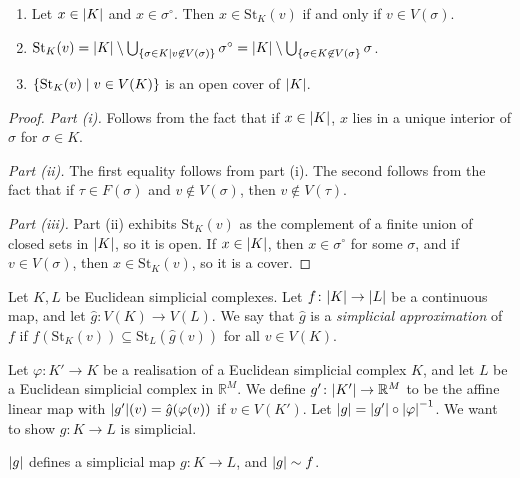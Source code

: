 \begin{lemma}
	\begin{enumerate}
		\item Let \( x \in \abs{K} \) and \( x \in \sigma^\circ \).
			Then \( x \in \mathrm{St}_K(v) \) if and only if \( v \in V(\sigma) \).
		\item \( \mathrm{St}_K(v) = \abs{K} \setminus \bigcup_{\qty{\sigma \in K \mid v \not\in V(\sigma)}} \sigma^\circ = \abs{K} \setminus \bigcup_{\qty{\sigma \in K \not\in V(\sigma}} \sigma \).
		\item \( \qty{\mathrm{St}_K(v) \mid v \in V(K)} \) is an open cover of \( \abs{K} \).
	\end{enumerate}
\end{lemma}
\begin{proof}
	\emph{Part (i).}
	Follows from the fact that if \( x \in \abs{K} \), \( x \) lies in a unique interior of \( \sigma \) for \( \sigma \in K \).

	\emph{Part (ii).}
	The first equality follows from part (i).
	The second follows from the fact that if \( \tau \in F(\sigma) \) and \( v \not\in V(\sigma) \), then \( v \not\in V(\tau) \).

	\emph{Part (iii).}
	Part (ii) exhibits \( \mathrm{St}_K(v) \) as the complement of a finite union of closed sets in \( \abs{K} \), so it is open.
	If \( x \in \abs{K} \), then \( x \in \sigma^\circ \) for some \( \sigma \), and if \( v \in V(\sigma) \), then \( x \in \mathrm{St}_K(v) \), so it is a cover.
\end{proof}
\begin{definition}
	Let \( K, L \) be Euclidean simplicial complexes.
	Let \( f \colon \abs{K} \to \abs{L} \) be a continuous map, and let \( \hat g \colon V(K) \to V(L) \).
	We say that \( \hat g \) is a \emph{simplicial approximation} of \( f \) if \( f(\mathrm{St}_K(v)) \subseteq \mathrm{St}_L(\hat g(v)) \) for all \( v \in V(K) \).
\end{definition}
Let \( \varphi \colon K' \to K \) be a realisation of a Euclidean simplicial complex \( K \), and let \( L \) be a Euclidean simplicial complex in \( \mathbb R^M \).
We define \( g' \colon \abs{K'} \to \mathbb R^M \) to be the affine linear map with \( \abs{g'}(v) = \hat g(\varphi(v)) \) if \( v \in V(K') \).
Let \( \abs{g} = \abs{g'} \circ \abs{\varphi}^{-1} \).
We want to show \( g \colon K \to L \) is simplicial.
\begin{theorem}
	\( \abs{g} \) defines a simplicial map \( g \colon K \to L \), and \( \abs{g} \sim f \).
\end{theorem}
